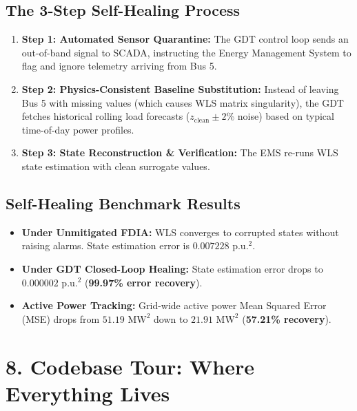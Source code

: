 \documentclass[10pt,a4paper]{article}
\begin{document}
\subsection{The 3-Step Self-Healing Process}
\begin{enumerate}
    \item \textbf{Step 1: Automated Sensor Quarantine:} The GDT control loop sends an out-of-band signal to SCADA, instructing the Energy Management System to flag and ignore telemetry arriving from Bus 5.
    \item \textbf{Step 2: Physics-Consistent Baseline Substitution:} Instead of leaving Bus 5 with missing values (which causes WLS matrix singularity), the GDT fetches historical rolling load forecasts ($z_{\text{clean}} \pm 2\%$ noise) based on typical time-of-day power profiles.
    \item \textbf{Step 3: State Reconstruction \& Verification:} The EMS re-runs WLS state estimation with clean surrogate values.
\end{enumerate}

\subsection{Self-Healing Benchmark Results}
\begin{itemize}[noitemsep]
    \item \textbf{Under Unmitigated FDIA:} WLS converges to corrupted states without raising alarms. State estimation error is $0.007228\text{ p.u.}^2$.
    \item \textbf{Under GDT Closed-Loop Healing:} State estimation error drops to $0.000002\text{ p.u.}^2$ (\textbf{99.97\% error recovery}).
    \item \textbf{Active Power Tracking:} Grid-wide active power Mean Squared Error (MSE) drops from $51.19\text{ MW}^2$ down to $21.91\text{ MW}^2$ (\textbf{57.21\% recovery}).
\end{itemize}

\section{8. Codebase Tour: Where Everything Lives}
\end{document}

